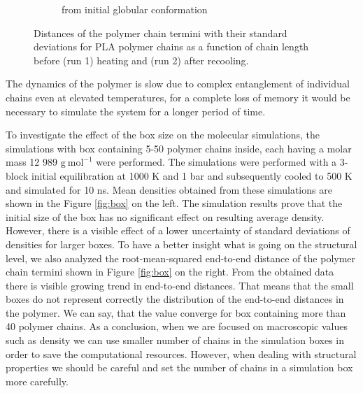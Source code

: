\begin{figure}[htb!]
\begin{subfigure}{0.5\textwidth}
		\caption{from initial globular conformation}
		\vspace{-0.2cm}
		\label{fig:subim2}
	\end{subfigure}
	\caption{Distances of the polymer chain termini with their standard deviations  for PLA polymer chains as a function of chain length before (run 1) heating and (run 2) after recooling.}
	\label{fig:pla_konce}
\end{figure}      

The dynamics of the polymer is slow due to complex entanglement of individual chains even at elevated temperatures, for a complete loss of memory it would be necessary to simulate the system for a longer period of time.

To investigate the effect of the box size on the molecular simulations, the simulations with box containing 5-50 polymer chains inside, each having a molar mass 12 989 $\mathrm{g \ mol^{-1}}$ were performed. The simulations were performed with a 3-block initial equilibration at 1000 K and 1 bar and subsequently cooled to 500 K and simulated for 10 ns. Mean densities obtained from these simulations are shown in the Figure \ref{fig:box} on the left. The simulation results prove that the initial size of the box has no significant effect on resulting average density. However, there is a visible effect of a lower uncertainty of standard deviations of densities for larger boxes. To have a better insight what is going on the structural level, we also analyzed the root-mean-squared end-to-end distance of the polymer chain termini shown in Figure \ref{fig:box} on the right. From the obtained data there is visible growing trend in end-to-end distances. That means that the small boxes do not represent correctly the distribution of the end-to-end distances in the polymer. We can say, that the value converge for box containing more than 40 polymer chains. As a conclusion, when we are focused on macroscopic values such as density we can use smaller number of chains in the simulation boxes in order to save the computational resources. However, when dealing with structural properties we should be careful and set the number of chains in a simulation box more carefully.



